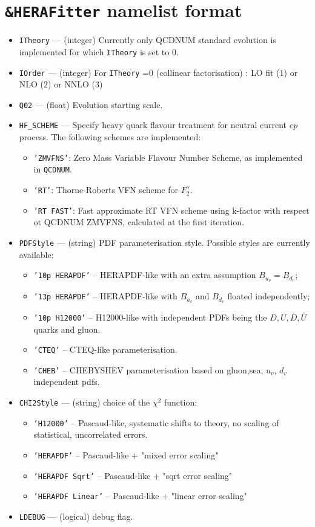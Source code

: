 \documentclass[11pt,a4paper]{article}
\begin{document}
\section{{\tt \&HERAFitter} namelist format}

\label{sec:herafitter}
\begin{itemize}
  \item {\tt ITheory} --- (integer) Currently only QCDNUM standard evolution
     is implemented for which {\tt ITheory} is set to 0.
  \item {\tt IOrder} --- (integer) For {\tt ITheory} =0 (collinear factorisation) : 
        LO fit (1) or NLO (2) or NNLO (3) 
  \item {\tt Q02} --- (float) Evolution starting scale.
  \item {\tt HF\_SCHEME} --- Specify heavy quark flavour treatment for neutral
 current $ep$ process. The following schemes are implemented: 
    \begin{itemize}
      \item {\tt 'ZMVFNS'}: Zero Mass Variable Flavour Number Scheme, as implemented
 in {\tt QCDNUM}.
      \item {\tt 'RT'}: Thorne-Roberts VFN scheme for $F_2^{\gamma}$. 
      \item {\tt 'RT FAST'}: Fast approximate RT VFN scheme using k-factor 
with respect ot QCDNUM ZMVFNS, calculated at the first iteration.
    \end{itemize}
\item {\tt PDFStyle} --- (string) PDF parameterisation style. Possible styles are currently available:
   \begin{itemize}
  \item{\tt '10p HERAPDF'} -- HERAPDF-like with an extra assumption 
                                 $B_{u_v} = B_{d_v}$;
  \item{\tt '13p HERAPDF'} -- HERAPDF-like with $B_{u_v}$ and $B_{d_v}$ 
                          floated independently;
  \item{\tt '10p H12000'}  -- H12000-like with independent PDFs being the
               $D,U,\bar{D},\bar{U}$ quarks and gluon.
  \item{\tt 'CTEQ'}        -- CTEQ-like parameterisation.
  \item{\tt 'CHEB'}        -- CHEBYSHEV parameterisation based on 
         gluon,sea, $u_{v}$, $d_{v}$ independent pdfs.
 \end{itemize}
\item {\tt CHI2Style}  --- (string) choice of the $\chi^2$ function:
   \begin{itemize}
   \item {\tt 'H12000'} -- Pascaud-like, systematic shifts to theory, no scaling of statistical, uncorrelated errors.
   \item {\tt 'HERAPDF'} -- Pascaud-like + "mixed error scaling"
   \item {\tt 'HERAPDF Sqrt'}   -- Pascaud-like + "sqrt error scaling"
   \item {\tt 'HERAPDF Linear'} -- Pascaud-like + "linear error scaling"
 \end{itemize}
  \item {\tt LDEBUG}  --- (logical) debug flag.
\end{itemize}
\end{document}
